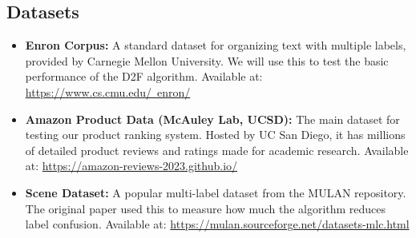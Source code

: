 \documentclass[conference]{IEEEtran}
\begin{document}
\subsection{Datasets}
\begin{itemize}
    \item \textbf{Enron Corpus:} A standard dataset for organizing text with multiple labels, provided by Carnegie Mellon University. We will use this to test the basic performance of the D2F algorithm. Available at: \href{https://www.cs.cmu.edu/~enron/}{https://www.cs.cmu.edu/~enron/}
    
    \item \textbf{Amazon Product Data (McAuley Lab, UCSD):} The main dataset for testing our product ranking system. Hosted by UC San Diego, it has millions of detailed product reviews and ratings made for academic research. Available at: \href{https://amazon-reviews-2023.github.io/}{https://amazon-reviews-2023.github.io/}
    
    \item \textbf{Scene Dataset:} A popular multi-label dataset from the MULAN repository. The original paper used this to measure how much the algorithm reduces label confusion. Available at: \href{https://mulan.sourceforge.net/datasets-mlc.html}{https://mulan.sourceforge.net/datasets-mlc.html}
\end{itemize}

    
    
\end{document}
